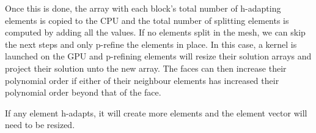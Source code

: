 Once this is done, the array with each block's total number of h-adapting elements is copied to the
CPU and the total number of splitting elements is computed by adding all the values. If no elements
split in the mesh, we can skip the next steps and only p-refine the elements in place. In this case,
a kernel is launched on the GPU and p-refining elements will resize their solution arrays and
project their solution unto the new array. The faces can then increase their polynomial order if
either of their neighbour elements has increased their polynomial order beyond that of the face.

If any element h-adapts, it will create more elements and the element vector will need to be
resized. 